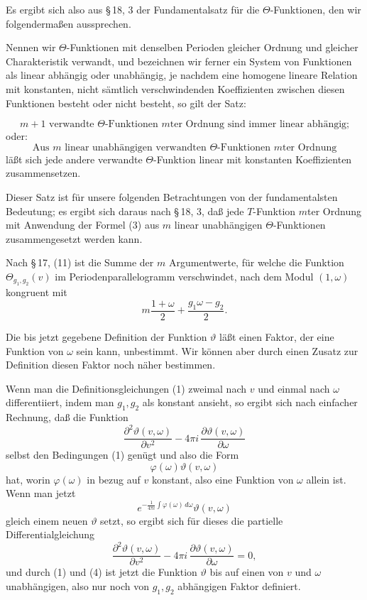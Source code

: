 \documentclass[11pt]{article}
\providecommand{\dd}{\,d}
\begin{document}
Es ergibt sich also aus \S\,18, 3 der Fundamentalsatz für die $\Theta$-Funktionen, den wir folgendermaßen aussprechen.

Nennen wir $\Theta$-Funktionen mit denselben Perioden gleicher Ordnung und gleicher Charakteristik verwandt, und bezeichnen wir ferner ein System von Funktionen als linear abhängig oder unabhängig, je nachdem eine homogene lineare Relation mit konstanten, nicht sämtlich verschwindenden Koeffizienten zwischen diesen Funktionen besteht oder nicht besteht, so gilt der Satz:

\[
m+1 \text{ verwandte } \Theta\text{-Funktionen } m\text{ter Ordnung sind immer linear abhängig;}
\]
oder:
\[
\text{Aus } m \text{ linear unabhängigen verwandten } \Theta\text{-Funktionen } m\text{ter Ordnung}
\]
läßt sich jede andere verwandte $\Theta$-Funktion linear mit konstanten Koeffizienten zusammensetzen.

Dieser Satz ist für unsere folgenden Betrachtungen von der fundamentalsten Bedeutung; es ergibt sich daraus nach \S\,18, 3, daß jede $T$-Funktion $m$ter Ordnung mit Anwendung der Formel (3) aus $m$ linear unabhängigen $\Theta$-Funktionen zusammengesetzt werden kann.

Nach \S\,17, (11) ist die Summe der $m$ Argumentwerte, für welche die Funktion $\Theta_{g_1,g_2}(v)$ im Periodenparallelogramm verschwindet, nach dem Modul $(1,\omega)$ kongruent mit
\[
m\frac{1+\omega}{2}+\frac{g_1\omega-g_2}{2}.
\]

Die bis jetzt gegebene Definition der Funktion $\vartheta$ läßt einen Faktor, der eine Funktion von $\omega$ sein kann, unbestimmt. Wir können aber durch einen Zusatz zur Definition diesen Faktor noch näher bestimmen.

Wenn man die Definitionsgleichungen (1) zweimal nach $v$ und einmal nach $\omega$ differentiiert, indem man $g_1,g_2$ als konstant ansieht, so ergibt sich nach einfacher Rechnung, daß die Funktion
\[
\frac{\partial^2\vartheta(v,\omega)}{\partial v^2}-4\pi i\,\frac{\partial\vartheta(v,\omega)}{\partial\omega}
\]
selbst den Bedingungen (1) genügt und also die Form
\[
\varphi(\omega)\vartheta(v,\omega)
\]
hat, worin $\varphi(\omega)$ in bezug auf $v$ konstant, also eine Funktion von $\omega$ allein ist. Wenn man jetzt
\[
e^{-\frac{1}{4\pi i}\int \varphi(\omega)\dd\omega}\vartheta(v,\omega)
\]
gleich einem neuen $\vartheta$ setzt, so ergibt sich für dieses die partielle Differentialgleichung
\begin{equation}
\frac{\partial^2\vartheta(v,\omega)}{\partial v^2}-4\pi i\,\frac{\partial\vartheta(v,\omega)}{\partial\omega}=0,
\tag{4}
\end{equation}
und durch (1) und (4) ist jetzt die Funktion $\vartheta$ bis auf einen von $v$ und $\omega$ unabhängigen, also nur noch von $g_1,g_2$ abhängigen Faktor definiert.
\end{document}
